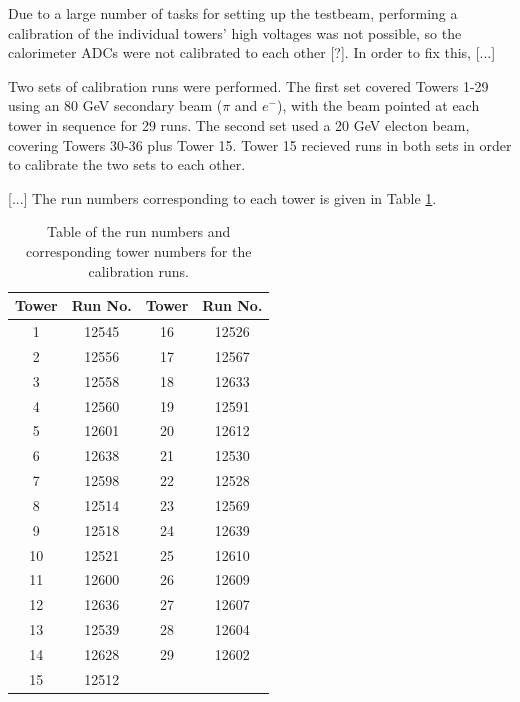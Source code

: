 Due to a large number of tasks for setting up the testbeam, performing a calibration of the individual towers' high voltages was not possible, so the calorimeter \acrshort{ADC}s were not calibrated to each other [?]. In order to fix this, [...]

Two sets of calibration runs were performed. The first set covered Towers 1-29 using an 80 GeV secondary beam ($\pi$ and $e^{-}$), with the beam pointed at each tower in sequence for 29 runs. The second set used a 20 GeV electon beam, covering Towers 30-36 plus Tower 15. Tower 15 recieved runs in both sets in order to calibrate the two sets to each other. 

[...] The run numbers corresponding to each tower is given in Table \ref{table:idea/calibrationruns}.

\begin{table}[h]
\centering
	\begin{tabular}{ c c | c c }
	\hline \hline
	\textbf{Tower} & \textbf{Run No.} & \textbf{Tower} & \textbf{Run No.} \\ \hline \hline
	 1 & 12545 & 16 & 12526 \\
	 2 & 12556 & 17 & 12567 \\
	 3 & 12558 & 18 & 12633 \\
	 4 & 12560 & 19 & 12591 \\
	 5 & 12601 & 20 & 12612 \\
	 6 & 12638 & 21 & 12530 \\
	 7 & 12598 & 22 & 12528 \\
	 8 & 12514 & 23 & 12569 \\
	 9 & 12518 & 24 & 12639 \\
	10 & 12521 & 25 & 12610 \\
	11 & 12600 & 26 & 12609 \\
	12 & 12636 & 27 & 12607 \\
	13 & 12539 & 28 & 12604 \\
	14 & 12628 & 29 & 12602 \\
	15 & 12512 &    &    \\ \hline
	\end{tabular}
	\caption{Table of the run numbers and corresponding tower numbers for the calibration runs.}
	\label{table:idea/calibrationruns}
\end{table}

